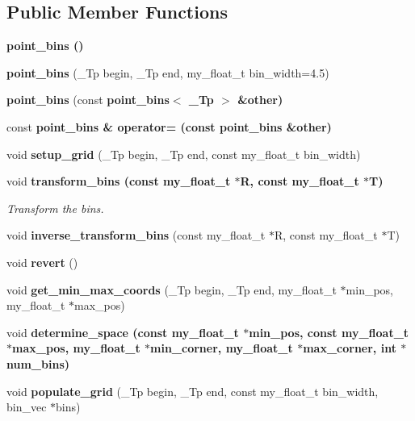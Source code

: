 \subsection*{Public Member Functions}
\begin{CompactItemize}
\item 
\bf{point\_\-bins} ()
\item 
\textbf{point\_\-bins} (\_\-Tp begin, \_\-Tp end, my\_\-float\_\-t bin\_\-width=4.5)\label{classASCbase_1_1point__bins_612dc97af37ea4512699f0fc0d47c61a}

\item 
\textbf{point\_\-bins} (const \bf{point\_\-bins}$<$ \_\-Tp $>$ \&other)\label{classASCbase_1_1point__bins_d2ed01481c90b33ff07f0668e039e89f}

\item 
const \bf{point\_\-bins} \& \textbf{operator=} (const \bf{point\_\-bins} \&other)\label{classASCbase_1_1point__bins_ec766713f1c00b6cca41d52940f91050}

\item 
void \textbf{setup\_\-grid} (\_\-Tp begin, \_\-Tp end, const my\_\-float\_\-t bin\_\-width)\label{classASCbase_1_1point__bins_8a32f681bd20aa78a9b1cd3c0773be1e}

\item 
void \bf{transform\_\-bins} (const my\_\-float\_\-t $\ast$R, const my\_\-float\_\-t $\ast$T)
\begin{CompactList}\small\item\em Transform the bins. \item\end{CompactList}\item 
void \textbf{inverse\_\-transform\_\-bins} (const my\_\-float\_\-t $\ast$R, const my\_\-float\_\-t $\ast$T)\label{classASCbase_1_1point__bins_ecf57c0678d1fec450842dfef3b81a97}

\item 
void \textbf{revert} ()\label{classASCbase_1_1point__bins_a68b236a6dcfb2a1d344ae6b2cf3a7e3}

\item 
void \textbf{get\_\-min\_\-max\_\-coords} (\_\-Tp begin, \_\-Tp end, my\_\-float\_\-t $\ast$min\_\-pos, my\_\-float\_\-t $\ast$max\_\-pos)\label{classASCbase_1_1point__bins_00ff5e0a19964585b8e01189e0ca0f82}

\item 
void \bf{determine\_\-space} (const my\_\-float\_\-t $\ast$min\_\-pos, const my\_\-float\_\-t $\ast$max\_\-pos, my\_\-float\_\-t $\ast$min\_\-corner, my\_\-float\_\-t $\ast$max\_\-corner, int $\ast$num\_\-bins)
\item 
void \textbf{populate\_\-grid} (\_\-Tp begin, \_\-Tp end, const my\_\-float\_\-t bin\_\-width, bin\_\-vec $\ast$bins)\label{classASCbase_1_1point__bins_6535d13b3b00438158656471f67a44c6}


\end{CompactItemize}
